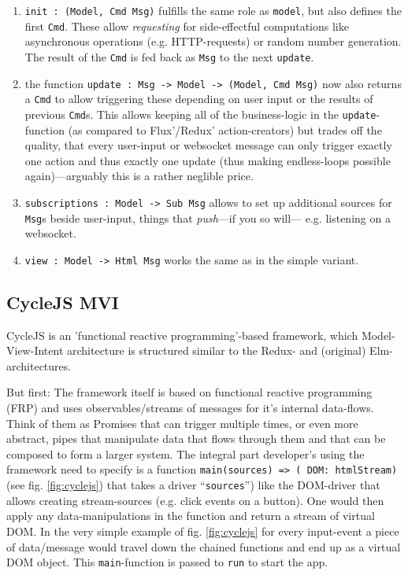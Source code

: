 \begin{enumerate}
    \item \texttt{init : (Model, Cmd Msg)} fulfills the same role as \texttt{model}, but also defines the first \texttt{Cmd}. These allow \textit{requesting} for side-effectful computations like asynchronous operations (e.g. HTTP-requests) or random number generation. The result of the \texttt{Cmd} is fed back as \texttt{Msg} to the next \texttt{update}.
    \item the function \texttt{update : Msg -> Model -> (Model, Cmd Msg)} now also returns a \texttt{Cmd} to allow triggering these depending on user input or the results of previous \texttt{Cmd}s. This allows keeping all of the business-logic in the \texttt{update}-function (as compared to Flux'/Redux' action-creators) but trades off the quality, that every user-input or websocket message can only trigger exactly one action and thus exactly one update (thus making endless-loops
        possible again)---arguably this is a rather neglible price.
    \item \texttt{subscriptions : Model -> Sub Msg} allows to set up additional sources for \texttt{Msg}s beside user-input, things that \textit{push}---if you so will---
e.g. listening on a websocket.
    \item \texttt{view : Model -> Html Msg} works the same as in the simple variant.
\end{enumerate}

\subsection{CycleJS MVI}

CycleJS is an 'functional reactive programming'-based framework, which Model-View-Intent architecture is structured similar to the Redux- and (original) Elm-architectures. 

But first: The framework itself is based on functional reactive programming (FRP) and uses observables/streams of messages for it's internal data-flows. Think of them as Promises that can trigger multiple times, or even more abstract, pipes that manipulate data that flows through them and that can be composed to form a larger system. The integral part developer's using the framework need to specify is a function \texttt{main(sources) => ({ DOM: htmlStream})} (see fig. \ref{fig:cyclejs}) that takes a driver ``\texttt{sources}'') like the DOM-driver that allows creating stream-sources (e.g. click events on a button). One would then apply any data-manipulations in the function and return a stream of virtual DOM. In the very simple example of fig. \ref{fig:cyclejs} for every input-event a piece of data/message would travel down the chained functions and end up as a virtual DOM object. This \texttt{main}-function is passed to \texttt{run} to start the app.


